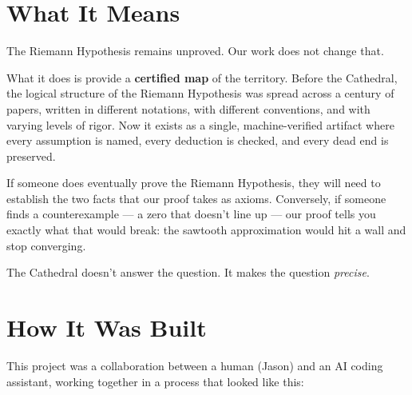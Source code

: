 \documentclass[12pt,a4paper]{article}
\begin{document}
\section*{What It Means}

The Riemann Hypothesis remains unproved. Our work does not change that.

What it does is provide a \textbf{certified map} of the territory.
Before the Cathedral, the logical structure of the Riemann Hypothesis
was spread across a century of papers, written in different notations,
with different conventions, and with varying levels of rigor. Now it
exists as a single, machine-verified artifact where every assumption is
named, every deduction is checked, and every dead end is preserved.

If someone does eventually prove the Riemann Hypothesis, they will need
to establish the two facts that our proof takes as axioms. Conversely,
if someone finds a counterexample --- a zero that doesn't line up ---
our proof tells you exactly what that would break: the sawtooth
approximation would hit a wall and stop converging.

The Cathedral doesn't answer the question. It makes the question
\emph{precise}.

\section*{How It Was Built}

This project was a collaboration between a human (Jason) and an AI
coding assistant, working together in a process that looked like this:
\end{document}
